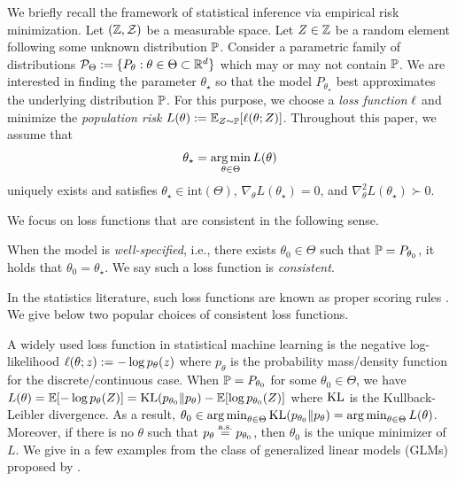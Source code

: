 We briefly recall the framework of statistical inference via empirical risk minimization.
Let $(\mathbb{Z}, \mathcal{Z})$ be a measurable space.
Let $Z \in \mathbb{Z}$ be a random element following some unknown distribution $\operatorname{\mathbb P}$.
Consider a parametric family of distributions $\mathcal{P}_\Theta := \{P_\theta: \theta \in \Theta \subset {\mathbb R}^d\}$ which may or may not contain $\operatorname{\mathbb P}$.
We are interested in finding the parameter $\theta_\star$ so that the model $P_{\theta_\star}$ best approximates the underlying distribution $\operatorname{\mathbb P}$.
For this purpose, we choose a \emph{loss function} $\ell$ and minimize the \emph{population risk} $L(\theta) := \operatorname{\mathbb E}_{Z \sim \operatorname{\mathbb P}}[\ell(\theta; Z)]$.
Throughout this paper, we assume that
\begin{align*}
     \theta_\star = \operatorname*{arg\,min}_{\theta \in \Theta} L(\theta)
\end{align*}
uniquely exists and satisfies $\theta_\star \in \text{int}(\Theta)$, $\nabla_\theta L(\theta_\star) = 0$, and $\nabla_\theta^2 L(\theta_\star) \succ 0$.

We focus on loss functions that are consistent in the following sense.

\begin{customasmp}{0}\label{asmp:proper_loss}
    When the model is \emph{well-specified}, i.e., there exists $\theta_0 \in \Theta$ such that $\operatorname{\mathbb P} = P_{\theta_0}$, it holds that $\theta_0 = \theta_\star$.
    We say such a loss function is \emph{consistent}.
\end{customasmp}

In the statistics literature, such loss functions are known as proper scoring rules \citep{dawid2016scoring}.
We give below two popular choices of consistent loss functions.

\begin{example}
    A widely used loss function in statistical machine learning is the negative log-likelihood $\ell(\theta; z) := -\log{p_\theta(z)}$ where $p_\theta$ is the probability mass/density function for the discrete/continuous case.
    When $\operatorname{\mathbb P} = P_{\theta_0}$ for some $\theta_0 \in \Theta$,
    we have $L(\theta) = \operatorname{\mathbb E}[-\log{p_\theta(Z)}] = \operatorname{KL}(p_{\theta_0} \Vert p_\theta) - \operatorname{\mathbb E}[\log{p_{\theta_0}(Z)}]$ where $\operatorname{KL}$ is the Kullback-Leibler divergence.
    As a result, $\theta_0 \in \operatorname*{arg\,min}_{\theta \in \Theta} \operatorname{KL}(p_{\theta_0} \Vert p_\theta) = \operatorname*{arg\,min}_{\theta \in \Theta} L(\theta)$.
    Moreover, if there is no $\theta$ such that $p_\theta \overset{\mbox{\scriptsize a.s.}}{=} p_{\theta_0}$, then $\theta_0$ is the unique minimizer of $L$.
    We give in  a few examples from the class of generalized linear models (GLMs) proposed by \citet{nelder1972generalized}.
\end{example}

